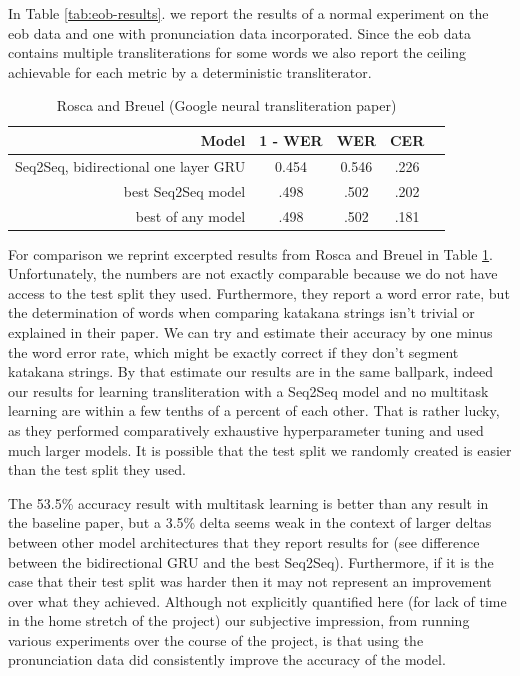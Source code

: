 \documentclass{article}
\begin{document}
In Table \ref{tab:eob-results}. we report the results
of a normal experiment on the eob data
and one with pronunciation data incorporated.
Since the eob data contains multiple transliterations for some words
we also report the ceiling achievable for each metric
by a deterministic transliterator.

\begin{table}[h]
  \centering
  \begin{tabular}{r | c c c c}
    \toprule
    Model & 1 - WER & WER & CER \\
    \midrule{}
    Seq2Seq, bidirectional one layer GRU & 0.454 & 0.546 & .226 \\
    best Seq2Seq model & .498 & .502 & .202 \\
    best of any model & .498 & .502 & .181 \\
    \bottomrule
  \end{tabular}
  \caption{Rosca and Breuel \cite{Rosca2016SequencetosequenceNN} (Google neural
    transliteration paper)}
  \label{tab:baseline-results}
\end{table}

For comparison we reprint excerpted results
from Rosca and Breuel \cite{Rosca2016SequencetosequenceNN}
in Table \ref{tab:baseline-results}.
Unfortunately,
the numbers are not exactly comparable
because we do not have access to the test split they used.
Furthermore,
they report a word error rate,
but the determination of words when comparing katakana strings
isn't trivial or explained in their paper.
We can try and estimate their accuracy
by one minus the word error rate,
which might be exactly correct if they don't segment katakana strings.
By that estimate our results are in the same ballpark,
indeed our results for learning transliteration
with a Seq2Seq model and no multitask learning
are within a few tenths of a percent of each other.
That is rather lucky,
as they performed comparatively exhaustive hyperparameter tuning
and used much larger models.
It is possible that the test split we randomly created
is easier than the test split they used.

The 53.5\% accuracy result with multitask learning
is better than any result in the baseline paper,
but a 3.5\% delta seems weak
in the context of larger deltas between other model architectures
that they report results for
(see difference between the bidirectional GRU and the best Seq2Seq).
Furthermore,
if it is the case that their test split was harder
then it may not represent an improvement over what they achieved.
Although not explicitly quantified here
(for lack of time in the home stretch of the project)
our subjective impression,
from running various experiments over the course of the project,
is that using the pronunciation data
did consistently improve the accuracy of the model.
\end{document}

